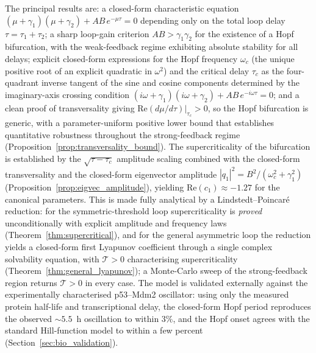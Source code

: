 \documentclass[sn-mathphys,Numbered]{sn-jnl}
\theoremstyle{thmstyleone}
\theoremstyle{thmstyletwo}
\theoremstyle{thmstylethree}
\begin{document}
The principal results are: a closed-form characteristic equation
$(\mu+\gamma_1)(\mu+\gamma_2)+AB\,e^{-\mu\tau}=0$ depending only on the
total loop delay $\tau=\tau_1+\tau_2$; a sharp loop-gain criterion
$AB>\gamma_1\gamma_2$ for the existence of a Hopf bifurcation, with the
weak-feedback regime exhibiting absolute stability for all delays;
explicit closed-form expressions for the Hopf frequency $\omega_c$
(the unique positive root of an explicit quadratic in $\omega^2$) and
the critical delay $\tau_c$ as the four-quadrant inverse tangent of the
sine and cosine components determined by the imaginary-axis crossing
condition $(i\omega+\gamma_1)(i\omega+\gamma_2)+AB\,e^{-i\omega\tau}=0$; and a
clean proof of transversality giving
$\mathrm{Re}(d\mu/d\tau)|_{\tau_c}>0$, so the Hopf bifurcation is
generic, with a parameter-uniform positive lower bound that establishes
quantitative robustness throughout the strong-feedback regime
(Proposition~\ref{prop:transversality_bound}). The supercriticality of
the bifurcation is established by the $\sqrt{\tau-\tau_c}$
amplitude scaling combined with the closed-form transversality and the
closed-form eigenvector amplitude $|q_1|^{2}=B^{2}/(\omega_c^{2}+\gamma_1^{2})$
(Proposition~\ref{prop:eigvec_amplitude}), yielding
$\mathrm{Re}(c_1)\approx -1.27$ for the canonical parameters. This is
made fully analytical by a Lindstedt--Poincar\'e reduction: for the
symmetric-threshold loop supercriticality is \emph{proved}
unconditionally with explicit amplitude and frequency laws
(Theorem~\ref{thm:supercritical}), and for the general asymmetric loop
the reduction yields a closed-form first Lyapunov coefficient through a
single complex solvability equation, with $\mathcal{T}>0$ characterising
supercriticality (Theorem~\ref{thm:general_lyapunov}); a Monte-Carlo
sweep of the strong-feedback region returns $\mathcal{T}>0$ in every case. The
model is validated externally against the experimentally characterised
p53--Mdm2 oscillator: using only the measured protein half-life and
transcriptional delay, the closed-form Hopf period reproduces the
observed $\sim5.5$~h oscillation to within $3\%$, and the Hopf onset
agrees with the standard Hill-function model to within a few percent
(Section~\ref{sec:bio_validation}).
\end{document}
